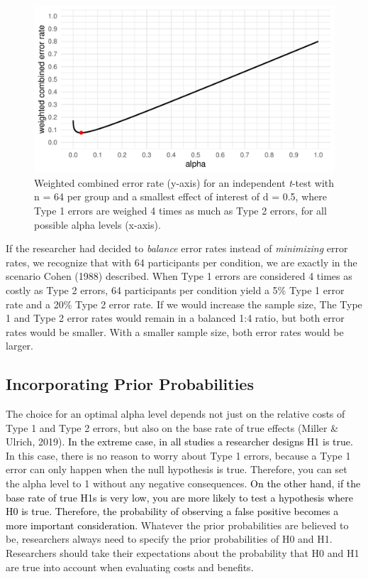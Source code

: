 \documentclass[
  english,
  ,man, a4paper,floatsintext]{apa6}
\begin{document}
\begin{figure}
\centering
\includegraphics{Justify_in_Practice_files/figure-latex/cost-plot-1.pdf}
\caption{\label{fig:cost-plot}Weighted combined error rate (y-axis) for an independent \emph{t}-test with n = 64 per group and a smallest effect of interest of d = 0.5, where Type 1 errors are weighed 4 times as much as Type 2 errors, for all possible alpha levels (x-axis).}
\end{figure}

If the researcher had decided to \emph{balance} error rates instead of \emph{minimizing} error rates, we recognize that with 64 participants per condition, we are exactly in the scenario Cohen (1988) described. When Type 1 errors are considered 4 times as costly as Type 2 errors, 64 participants per condition yield a 5\% Type 1 error rate and a 20\% Type 2 error rate. If we would increase the sample size, The Type 1 and Type 2 error rates would remain in a balanced 1:4 ratio, but both error rates would be smaller. With a smaller sample size, both error rates would be larger.

\hypertarget{incorporating-prior-probabilities}{%
\subsection{Incorporating Prior Probabilities}\label{incorporating-prior-probabilities}}

The choice for an optimal alpha level depends not just on the relative costs of Type 1 and Type 2 errors, but also on the base rate of true effects (Miller \& Ulrich, 2019). \textcolor{black}{In the extreme case, in all studies a researcher designs H1 is true.} In this case, there is no reason to worry about Type 1 errors, because a Type 1 error can only happen when the null hypothesis is true. Therefore, you can set the alpha level to 1 without any negative consequences.
\textcolor{black}{On the other hand, if the base rate of true H1s is very low, you are more likely to test a hypothesis where H0 is true. Therefore, the probability of observing a false positive becomes a more important consideration.}
Whatever the prior probabilities are believed to be, researchers always need to specify the prior probabilities of H0 and H1. Researchers should take their expectations about the probability that H0 and H1 are true into account when evaluating costs and benefits.
\end{document}
